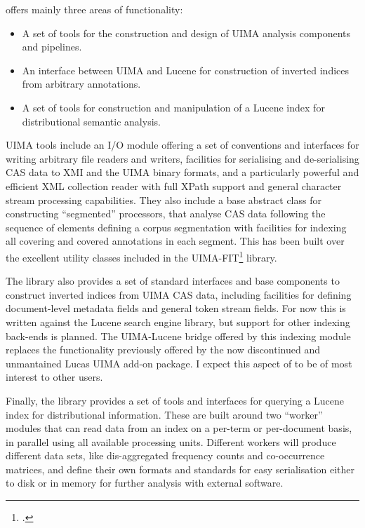  offers mainly three areas of functionality:
\begin{itemize}
    \item A set of tools for the construction and design of UIMA analysis components and pipelines.
    \item An interface between UIMA and Lucene for construction of inverted indices from arbitrary annotations.
    \item A set of tools for construction and manipulation of a Lucene index for distributional semantic analysis.
\end{itemize}

UIMA tools include an I/O module offering a set of conventions and interfaces for writing arbitrary file readers and writers, facilities for serialising and de-serialising CAS data to XMI and the UIMA binary formats, and a particularly powerful and efficient XML collection reader with full XPath support and general character stream processing capabilities.
They also include a base abstract class for constructing ``segmented'' processors, that analyse CAS data following the sequence of elements defining a corpus segmentation with facilities for indexing all covering and covered annotations in each segment.
This has been built over the excellent utility classes included in the UIMA-FIT\footnote{
    \citet{ogren2009}.
} library.

The library also provides a set of standard interfaces and base components to construct inverted indices from UIMA CAS data, including facilities for defining document-level metadata fields and general token stream fields.
For now this is written against the Lucene search engine library, but support for other indexing back-ends is planned.
The UIMA-Lucene bridge offered by this indexing module replaces the functionality previously offered by the now discontinued and unmantained Lucas UIMA add-on package.
I expect this aspect of  to be of most interest to other users.

Finally, the library provides a set of tools and interfaces for querying a Lucene index for distributional information.
These are built around two ``worker'' modules that can read data from an index on a per-term or per-document basis, in parallel using all available processing units.
Different workers will produce different data sets, like dis-aggregated frequency counts and co-occurrence matrices, and define their own formats and standards for easy serialisation either to disk or in memory for further analysis with external software.

